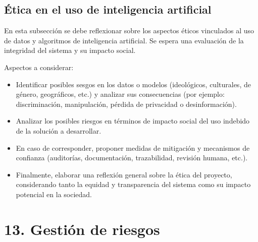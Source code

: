 \documentclass[
11pt, %
]{charter}
\begin{document}
\subsection{Ética en el uso de inteligencia artificial}

En esta subsección se debe reflexionar sobre los aspectos éticos vinculados al uso de datos y algoritmos de inteligencia artificial. Se espera una evaluación de la integridad del sistema y su impacto social.

Aspectos a considerar:

\begin{itemize}
	\item Identificar posibles sesgos en los datos o modelos (ideológicos, culturales, de género, geográficos, etc.) y analizar sus consecuencias (por ejemplo: discriminación, manipulación, pérdida de privacidad o desinformación).
	\item Analizar los posibles riesgos en términos de impacto social del uso indebido de la solución a desarrollar.
	\item En caso de corresponder, proponer medidas de mitigación y mecanismos de confianza (auditorías, documentación, trazabilidad, revisión humana, etc.).
	\item Finalmente, elaborar una reflexión general sobre la ética del proyecto, considerando tanto la equidad y transparencia del sistema como su impacto potencial en la sociedad.

\end{itemize}


\section{13. Gestión de riesgos}
\label{sec:riesgos}
\end{document}
